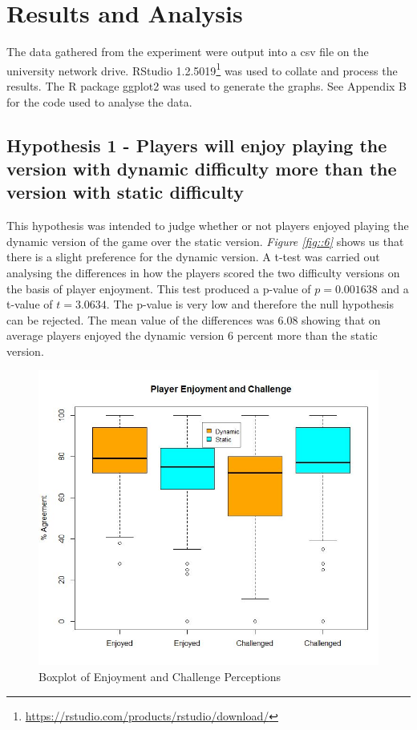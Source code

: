 \documentclass[journal]{IEEEtran}
\begin{document}
\section{Results and Analysis}

The data gathered from the experiment were output into a csv file on the university network drive. RStudio 1.2.5019\footnote{\url{https://rstudio.com/products/rstudio/download/}} was used to collate and process the results. The R package ggplot2 was used to generate the graphs. See Appendix B for the code used to analyse the data. 

\subsection{Hypothesis 1 - Players will enjoy playing the version with dynamic difficulty more than the version with static difficulty}

This hypothesis was intended to judge whether or not players enjoyed playing the dynamic version of the game over the static version. \textit{Figure \ref{fig::6}} shows us that there is a slight preference for the dynamic version. A t-test was carried out analysing the differences in how the players scored the two difficulty versions on the basis of player enjoyment. This test produced a p-value of $p = 0.001638$ and a t-value of $t = 3.0634$. The p-value is very low and therefore the null hypothesis can be rejected. The mean value of the differences was 6.08 showing that on average players enjoyed the dynamic version 6 percent more than the static version.


\begin{figure}[h]
	\includegraphics[width=1.0\linewidth]{playerenjoymentandchallenge.jpg}
	\caption{Boxplot of Enjoyment and Challenge Perceptions}
	\label{fig::5}
\end{figure} 
\end{document}

